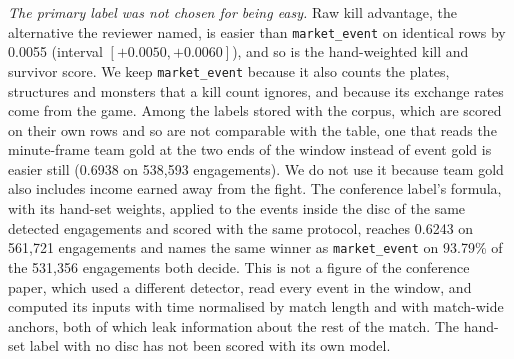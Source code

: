 \emph{The primary label was not chosen for being easy.} Raw kill advantage, the alternative the
reviewer named, is easier than \texttt{market\_event} on identical rows by 0.0055 (interval
$[+0.0050, +0.0060]$), and so is the hand-weighted kill and survivor score. We keep
\texttt{market\_event} because it also counts the plates, structures and monsters that a kill count
ignores, and because its exchange rates come from the game. Among the labels stored with the corpus,
which are scored on their own rows and so are not comparable with the table, one that reads the
minute-frame team gold at the two ends of the window instead of event gold is easier still (0.6938 on
538,593 engagements). We do not use it because team gold also includes income earned away from the
fight. The conference label's formula, with its hand-set weights, applied to the events inside the disc
of the same detected engagements and scored with the same protocol, reaches 0.6243 on 561,721
engagements and names the same winner as \texttt{market\_event} on 93.79\% of the 531,356 engagements
both decide. This is not a figure of the conference paper, which used a different detector, read every
event in the window, and computed its inputs with time normalised by match length and with match-wide
anchors, both of which leak information about the rest of the match. The hand-set label with no disc
has not been scored with its own model.

